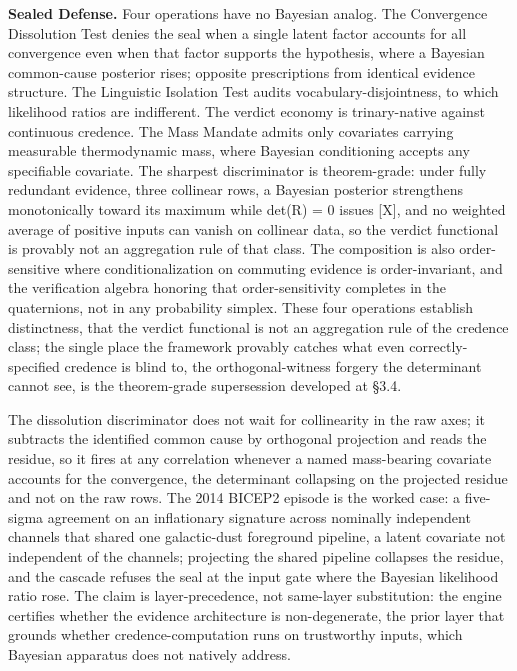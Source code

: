 \documentclass[10pt,twocolumn]{article}
\begin{document}
\textbf{Sealed Defense.} Four operations have no Bayesian analog. The
Convergence Dissolution Test denies the seal when a single latent factor
accounts for all convergence even when that factor supports the
hypothesis, where a Bayesian common-cause posterior rises; opposite
prescriptions from identical evidence structure. The Linguistic
Isolation Test audits vocabulary-disjointness, to which likelihood
ratios are indifferent. The verdict economy is trinary-native against
continuous credence. The Mass Mandate admits only covariates carrying
measurable thermodynamic mass, where Bayesian conditioning accepts any
specifiable covariate. The sharpest discriminator is theorem-grade:
under fully redundant evidence, three collinear rows, a Bayesian
posterior strengthens monotonically toward its maximum while det(R) = 0
issues {[}X{]}, and no weighted average of positive inputs can vanish on
collinear data, so the verdict functional is provably not an aggregation
rule of that class. The composition is also order-sensitive where
conditionalization on commuting evidence is order-invariant, and the
verification algebra honoring that order-sensitivity completes in the
quaternions, not in any probability simplex. These four operations
establish distinctness, that the verdict functional is not an
aggregation rule of the credence class; the single place the framework
provably catches what even correctly-specified credence is blind to, the
orthogonal-witness forgery the determinant cannot see, is the
theorem-grade supersession developed at §3.4.

The dissolution discriminator does not wait for collinearity in the raw
axes; it subtracts the identified common cause by orthogonal projection
and reads the residue, so it fires at any correlation whenever a named
mass-bearing covariate accounts for the convergence, the determinant
collapsing on the projected residue and not on the raw rows. The 2014
BICEP2 episode is the worked case: a five-sigma agreement on an
inflationary signature across nominally independent channels that shared
one galactic-dust foreground pipeline, a latent covariate not
independent of the channels; projecting the shared pipeline collapses
the residue, and the cascade refuses the seal at the input gate where
the Bayesian likelihood ratio rose. The claim is layer-precedence, not
same-layer substitution: the engine certifies whether the evidence
architecture is non-degenerate, the prior layer that grounds whether
credence-computation runs on trustworthy inputs, which Bayesian
apparatus does not natively address.
\end{document}
